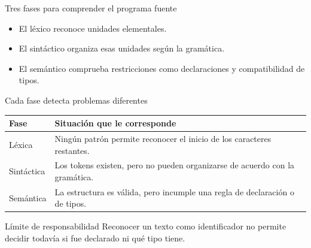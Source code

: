\documentclass[11pt,spanish]{beamer}
\begin{document}
\begin{frame}{Tres fases para comprender el programa fuente}
\vfill

\begin{center}
\end{center}

\bigskip

\begin{itemize}
\item El léxico reconoce unidades elementales.
\item El sintáctico organiza esas unidades según la gramática.
\item El semántico comprueba restricciones como declaraciones y compatibilidad de tipos.
\end{itemize}

\vfill
\end{frame}

\begin{frame}{Cada fase detecta problemas diferentes}
\vfill

\begin{center}
\small
\renewcommand{\arraystretch}{1.25}
\begin{tabular}{|L{.22\textwidth}|L{.65\textwidth}|}
\hline
\textbf{Fase} & \textbf{Situación que le corresponde} \tabularnewline
\hline
Léxica & Ningún patrón permite reconocer el inicio de los caracteres restantes. \tabularnewline
\hline
Sintáctica & Los tokens existen, pero no pueden organizarse de acuerdo con la gramática. \tabularnewline
\hline
Semántica & La estructura es válida, pero incumple una regla de declaración o de tipos. \tabularnewline
\hline
\end{tabular}
\end{center}

\bigskip

\begin{block}{Límite de responsabilidad}
Reconocer un texto como identificador no permite decidir todavía si fue declarado ni qué tipo tiene.
\end{block}

\vfill
\end{frame}
\end{document}
